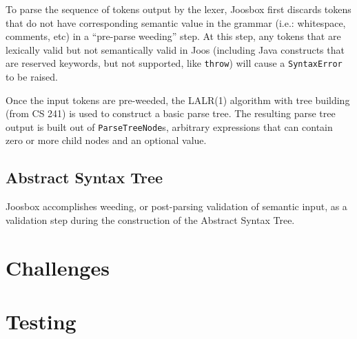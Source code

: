 \documentclass[letterpaper]{article}
\begin{document}
  To parse the sequence of tokens output by the lexer, Joosbox first discards
  tokens that do not have corresponding semantic value in the grammar (i.e.:
  whitespace, comments, etc) in a ``pre-parse weeding'' step. At this step,
  any tokens that are lexically valid but not semantically valid in Joos
  (including Java constructs that are reserved keywords, but not supported,
  like {\tt throw}) will cause a {\tt SyntaxError} to be raised.

  Once the input tokens are pre-weeded, the LALR(1) algorithm with tree building
  (from CS 241) is used to construct a basic parse tree. The resulting parse 
  tree output is built out of {\tt ParseTreeNode}s, arbitrary expressions
  that can contain zero or more child nodes and an optional value.

  \subsection{Abstract Syntax Tree}

  Joosbox accomplishes weeding, or post-parsing validation of semantic input,
  as a validation step during the construction of the Abstract Syntax Tree.

  \section{Challenges}


  \section{Testing}

\end{document}
